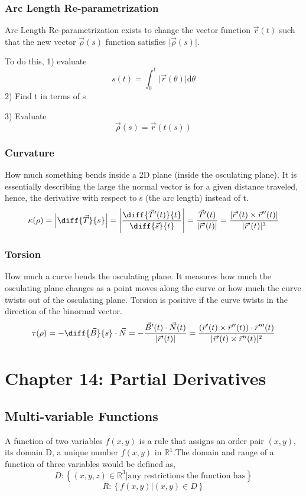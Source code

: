 \documentclass{article}
\begin{document}
\subsubsection{Arc Length Re-parametrization}
Arc Length Re-parametrization exists to change the vector function $\vec{r}(t)$ such that the new vector $\vec{\rho}(s)$ function satisfies $\lvert\vec{\rho}(s)\rvert$. 

To do this, 1) evaluate
$$s(t) = \int_0^t{\lvert\vec{r}(\theta)\rvert}\text{d}\theta$$
2) Find t in terms of s

3) Evaluate
$$\vec{\rho}(s) = \vec{r}(t(s))$$

\subsubsection{Curvature}
How much something bends inside a 2D plane (inside the osculating plane). It is essentially describing the large the normal vector is for a given distance traveled, hence, the derivative with respect to s (the arc length) instead of t. 
$$\kappa(\rho) = \left| \diff{\vec{T}}{s} \right| = \left| \frac{\diff{\vec{T}'(t)}{t}}{\diff{\vec{s}}{t}} \right| = \frac{\vec{T}'(t)}{\lvert \vec{r}'(t) \rvert} = \frac{|\vec{r}'(t)\times\vec{r}''(t)|}{|\vec{r}'(t)|^3}$$

\subsubsection{Torsion}
How much a curve bends the osculating plane. It measures how much the osculating plane changes as a point moves along the curve or how much the curve twists out of the osculating plane. Torsion is positive if the curve twists in the direction of the binormal vector. 
$$\tau(\rho) = - \diff{\vec{B}}{s}\cdot\vec{N} = - \frac{\vec{B}'(t)\cdot\vec{N}(t)}{|\vec{r}'(t)|} = \frac{(\vec{r}'(t)\times\vec{r}''(t))\cdot\vec{r}'''(t)}{|\vec{r}'(t)\times\vec{r}''(t)|^2}$$

\section{Chapter 14: Partial Derivatives}

\subsection{Multi-variable Functions}
A function of two variables $f(x,y)$ is a rule that assigns an order pair $(x,y)$, its domain D, a unique number $f(x,y)$ in $\mathbb{R}^1$.The domain and range of a function of three variables would be defined as,
$$D: \left\{ (x,y,z)\in\mathbb{R}^3 | \text{any restrictions the function has}\right\}$$
$$R: \left\{ f(x,y) | (x,y) \in D \right\}$$
\end{document}
